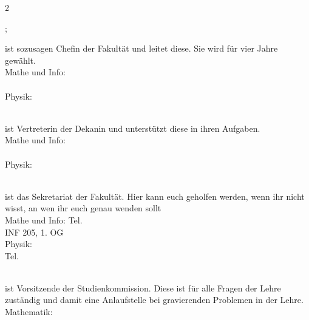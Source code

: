 \begin{multicols}{2}
\begin{description}
    \fsraum; \\

    \item[Die Dekanin] ist sozusagen Chefin der Fakultät und leitet diese. Sie wird für vier Jahre gewählt.\\
    
    Mathe und Info: \dekanmathelang \\
    \email{\dekanmatheemail} \\
    
    Physik: \dekanphysiklang \\
    \email{\dekanphysikemail}\\
    

    \item[Die Prodekanin] ist Vertreterin der Dekanin und unterstützt diese in ihren Aufgaben.\\
    
    Mathe und Info: \prodekanmathe \\
    \email{\prodekanmatheemail} \\
    
    Physik: \prodekanphysik  \\
    \email{\prodekanphysikAemail} \\
    \email{\prodekanphysikBemail}

    \item[Das Dekanat] ist das Sekretariat der Fakultät. Hier kann euch geholfen werden, wenn ihr nicht wisst, an wen ihr euch genau wenden sollt\\
    
    Mathe und Info: Tel. \dekanatmathetelefon \\
    \gls{INF} 205, 1. OG \\
    
    Physik: \dekanatphysik\\
    Tel.\dekanatphysiktelefon \\
    \email{\dekanatphysikemail}\\


    \item[Die Studiendekanin] ist Vorsitzende der Studienkommission. Diese ist für alle Fragen der Lehre zuständig und damit eine Anlaufstelle bei gravierenden Problemen in der Lehre.\\
    
    Mathematik: \studiendekanmathe \\
    \email{\studiendekanmatheemail} \\
    

\end{description}
\end{multicols}
